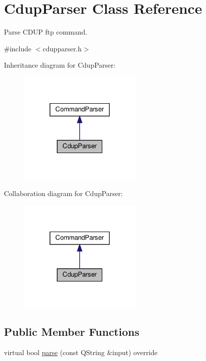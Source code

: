 \hypertarget{classCdupParser}{}\section{Cdup\+Parser Class Reference}
\label{classCdupParser}


Parse C\+D\+UP ftp command.  




{\ttfamily \#include $<$cdupparser.\+h$>$}



Inheritance diagram for Cdup\+Parser\+:\nopagebreak
\begin{figure}[H]
\begin{center}
\leavevmode
\includegraphics[width=170pt]{db/d72/classCdupParser__inherit__graph}
\end{center}
\end{figure}


Collaboration diagram for Cdup\+Parser\+:\nopagebreak
\begin{figure}[H]
\begin{center}
\leavevmode
\includegraphics[width=170pt]{df/de4/classCdupParser__coll__graph}
\end{center}
\end{figure}
\subsection*{Public Member Functions}
\begin{DoxyCompactItemize}
\item 
virtual bool \hyperlink{classCdupParser_abfd60eab9d76c34867434b8a36289701}{parse} (const Q\+String \&input) override
\end{DoxyCompactItemize}


